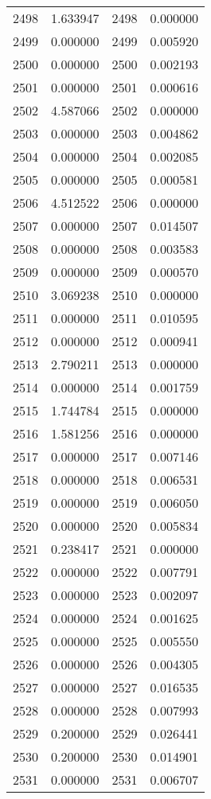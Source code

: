 \documentclass[12pt]{article}
\begin{document}
\begin{longtable}{@{}cccc@{}}
2498 & 1.633947 & 2498 & 0.000000 \\
2499 & 0.000000 & 2499 & 0.005920 \\
2500 & 0.000000 & 2500 & 0.002193 \\
2501 & 0.000000 & 2501 & 0.000616 \\
2502 & 4.587066 & 2502 & 0.000000 \\
2503 & 0.000000 & 2503 & 0.004862 \\
2504 & 0.000000 & 2504 & 0.002085 \\
2505 & 0.000000 & 2505 & 0.000581 \\
2506 & 4.512522 & 2506 & 0.000000 \\
2507 & 0.000000 & 2507 & 0.014507 \\
2508 & 0.000000 & 2508 & 0.003583 \\
2509 & 0.000000 & 2509 & 0.000570 \\
2510 & 3.069238 & 2510 & 0.000000 \\
2511 & 0.000000 & 2511 & 0.010595 \\
2512 & 0.000000 & 2512 & 0.000941 \\
2513 & 2.790211 & 2513 & 0.000000 \\
2514 & 0.000000 & 2514 & 0.001759 \\
2515 & 1.744784 & 2515 & 0.000000 \\
2516 & 1.581256 & 2516 & 0.000000 \\
2517 & 0.000000 & 2517 & 0.007146 \\
2518 & 0.000000 & 2518 & 0.006531 \\
2519 & 0.000000 & 2519 & 0.006050 \\
2520 & 0.000000 & 2520 & 0.005834 \\
2521 & 0.238417 & 2521 & 0.000000 \\
2522 & 0.000000 & 2522 & 0.007791 \\
2523 & 0.000000 & 2523 & 0.002097 \\
2524 & 0.000000 & 2524 & 0.001625 \\
2525 & 0.000000 & 2525 & 0.005550 \\
2526 & 0.000000 & 2526 & 0.004305 \\
2527 & 0.000000 & 2527 & 0.016535 \\
2528 & 0.000000 & 2528 & 0.007993 \\
2529 & 0.200000 & 2529 & 0.026441 \\
2530 & 0.200000 & 2530 & 0.014901 \\
2531 & 0.000000 & 2531 & 0.006707 \\

\end{longtable}
\end{document}
